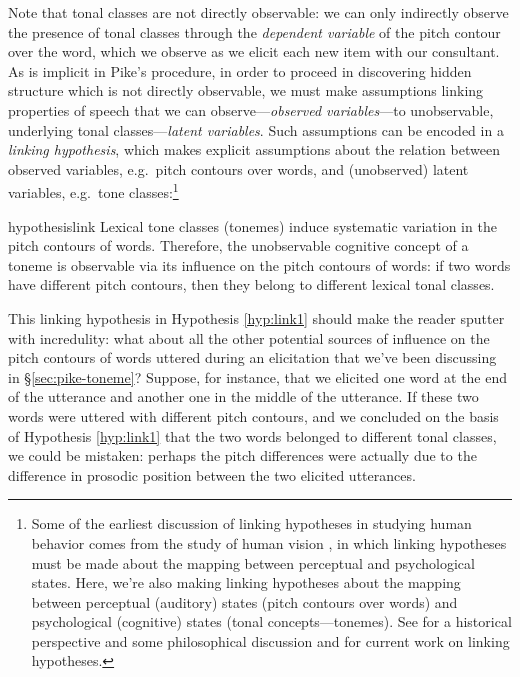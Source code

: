 \documentclass[12pt]{article}
\begin{document}
Note that tonal classes are not directly observable: we can only indirectly observe the
presence of tonal classes through the \textit{dependent variable} of
the pitch contour over the word, which we observe as we elicit each
new item with our consultant. As is implicit in Pike's procedure,
in order to proceed in discovering hidden structure which is not
directly observable, we must make assumptions linking properties of
speech that we can observe---\textit{observed variables}---to unobservable, underlying
tonal classes---\textit{latent variables}. Such assumptions can be encoded in a \textit{linking
hypothesis}, which makes explicit assumptions about the relation
between observed variables, e.g.\ pitch contours over words, and
(unobserved) latent variables, e.g.\ tone classes:\footnote{Some of
  the earliest discussion of linking hypotheses in studying human
  behavior comes from the study of human vision \citep{Brindley:1960},
  in which linking hypotheses must be made about the mapping between
  perceptual and psychological states. Here, we're also making
  linking hypotheses about the mapping between perceptual (auditory) states
  (pitch contours over words) and psychological (cognitive) states
  (tonal concepts---tonemes).  See \citet{Teller:1984} for a
  historical perspective and some philosophical discussion and
  \citet{Yurovsky:2012} for current work on linking hypotheses.}
\begin{restatable}{hypothesis}{link}
\label{hyp:link1}
Lexical tone classes (tonemes) induce systematic variation in the
pitch contours of words. Therefore, the unobservable cognitive concept
of a toneme is observable via its influence on the pitch contours of
words: if two words have different pitch contours, then they belong to
different lexical tonal classes.
\end{restatable}

This linking hypothesis in Hypothesis \ref{hyp:link1} should make the
reader sputter with incredulity: what about all the other potential sources of influence on the
pitch contours of words uttered during an elicitation that we've been
discussing in \S\ref{sec:pike-toneme}? Suppose, for instance, that we
elicited one word at the end of the utterance and another one in the
middle of the utterance. If these two words were uttered with different
pitch contours, and we concluded on the basis of Hypothesis
\ref{hyp:link1} that the two words belonged to different tonal
classes, we could be mistaken: perhaps the pitch differences were
actually due to the difference in prosodic position between the two
elicited utterances. 
\end{document}
